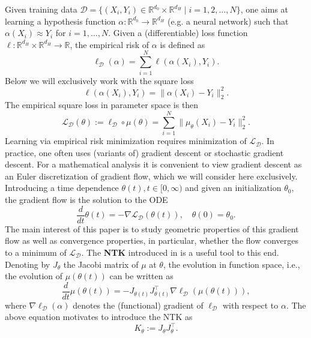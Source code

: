 \documentclass[twoside]{article}
\theoremstyle{definition}
\theoremstyle{remark}
\begin{document}
Given training data $\mathcal{D} = \{  (X_i,Y_i) \in \mathbb{R}^{d_0} \times \mathbb{R}^{d_H} \mid i = 1,2, \ldots, N \}$, one aims at learning a hypothesis function $\alpha: \mathbb{R}^{d_0} \to \mathbb{R}^{d_H}$ (e.g. a neural network) 
such that $\alpha(X_i) \approx Y_i$ for $i = 1,\ldots,N$. Given a (differentiable) loss function $\ell :\mathbb{R}^{d_H} \times \mathbb{R}^{d_H} \to \mathbb{R}$, the empirical risk of  $\alpha$ is defined as
\[ \textstyle
\ell_\mathcal{D}(\alpha) = \sum_{i=1}^N \ell(\alpha(X_i),Y_i). 
\]
Below we will exclusively work with the square loss 
\[
\ell(\alpha(X_i),Y_i) = \|\alpha(X_i) - Y_i\|_2^2.
\]
The empirical square loss in parameter space is then 
\[\textstyle
\mathcal{L}_{\mathcal{D}}(\theta) := \ell_{\mathcal{D}} \circ \mu(\theta) = \sum_{i=1}^N \|\mu_\theta(X_i) - Y_i\|_2^2.
\]
Learning via empirical risk minimization requires minimization of $\mathcal{L}_{\mathcal{D}}$. In practice, one often uses (variants of) gradient descent or stochastic gradient descent. For a mathematical analysis it is convenient to view gradient descent as an Euler discretization of gradient flow, which we will consider here exclusively. Introducing a time dependence $\theta(t), t \in [0,\infty)$ and given an initialization $\theta_0$, the gradient flow is the solution to the ODE
\begin{equation}\label{grad-flow-eq}
\frac{d}{dt}\theta(t) = - \nabla \mathcal{L}_{\mathcal{D}}(\theta(t)), \quad \theta(0) = \theta_0.
\end{equation}
The main interest of this paper is to study geometric properties of this gradient flow as well as convergence properties, in particular, whether the flow converges to a minimum of $\mathcal{L}_{\mathcal{D}}$. The \textbf{NTK} introduced in \cite{ntk} is a useful tool to this end. Denoting by $J_\theta$ the Jacobi matrix of $\mu$ at $\theta$, the evolution in function space, i.e., the evolution of $\mu(\theta(t))$ can be written as
\[
\frac{d}{dt} \mu(\theta(t)) = - J_{\theta(t)} J_{\theta(t)}^\top \nabla \ell_{\mathcal{D}}(\mu(\theta(t))), 
\]
where $\nabla \ell_\mathcal{D}(\alpha)$ denotes the (functional) gradient of $\ell_{\mathcal{D}}$ with respect to $\alpha$. The above equation motivates to introduce the NTK as
\[
K_\theta := J_\theta J_\theta^\top. 
\]
\end{document}
